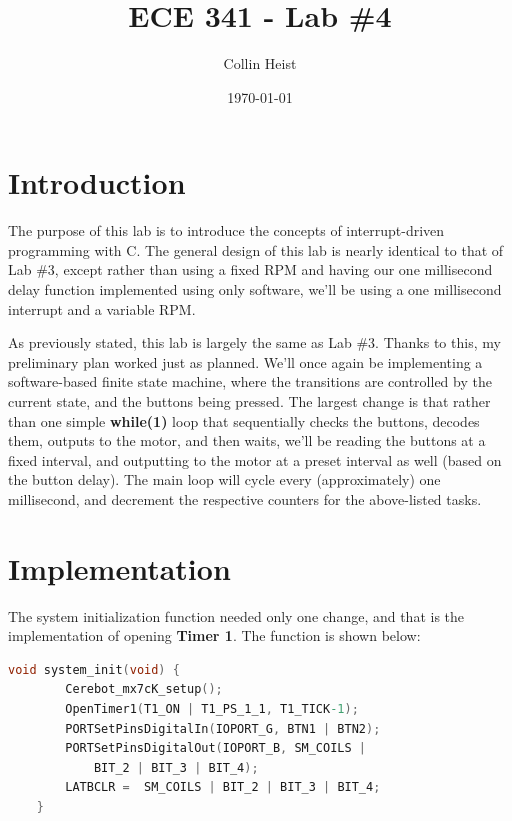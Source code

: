 \documentclass[a4paper, 12pt]{article}
\begin{document}
\title{ECE 341 - Lab \#4}
\author{Collin Heist}
\date{\today}
\maketitle
{}
\tableofcontents
\lstlistoflistings
\newpage
{}

\section{Introduction}
The purpose of this lab is to introduce the concepts of interrupt-driven programming with C. The general design of this lab is nearly identical to that of Lab \#3, except rather than using a fixed RPM and having our one millisecond delay function implemented using only software, we'll be using a one millisecond interrupt and a variable RPM.

As previously stated, this lab is largely the same as Lab \#3. Thanks to this, my preliminary plan worked just as planned. We'll once again be implementing a software-based finite state machine, where the transitions are controlled by the current state, and the buttons being pressed. The largest change is that rather than one simple \textbf{while(1)} loop that sequentially checks the buttons, decodes them, outputs to the motor, and then waits, we'll be reading the buttons at a fixed interval, and outputting to the motor at a preset interval as well (based on the button delay). The main loop will cycle every (approximately) one millisecond, and decrement the respective counters for the above-listed tasks.

\section{Implementation}
The system initialization function needed only one change, and that is the implementation of opening \textbf{Timer 1}. The function is shown below:

	\begin{mdframed}[backgroundcolor=code-gray, roundcorner=10pt,
								innerleftmargin=5, innertopmargin=5, innerbottommargin=5]	
	\begin{lstlisting}[language=C, caption=System Initialization, tabsize=2]
	void system_init(void) {
		Cerebot_mx7cK_setup();
		OpenTimer1(T1_ON | T1_PS_1_1, T1_TICK-1);
		PORTSetPinsDigitalIn(IOPORT_G, BTN1 | BTN2);
		PORTSetPinsDigitalOut(IOPORT_B, SM_COILS |
			BIT_2 | BIT_3 | BIT_4);
		LATBCLR =  SM_COILS | BIT_2 | BIT_3 | BIT_4;
	}
	\end{lstlisting}
	\end{mdframed}
	
\end{document}
